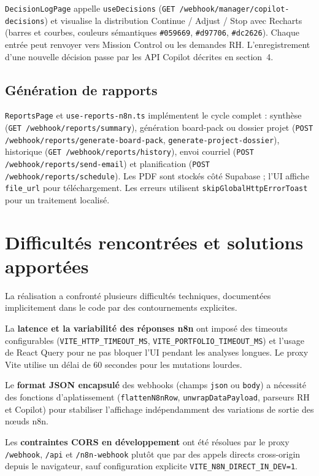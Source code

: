 \texttt{DecisionLogPage} appelle \texttt{useDecisions} (\texttt{GET /webhook/manager/copilot-decisions}) et visualise la distribution Continue / Adjust / Stop avec Recharts (barres et courbes, couleurs sémantiques \texttt{\#059669}, \texttt{\#d97706}, \texttt{\#dc2626}). Chaque entrée peut renvoyer vers Mission Control ou les demandes RH. L'enregistrement d'une nouvelle décision passe par les API Copilot décrites en section~4.

\subsection{Génération de rapports}

\texttt{ReportsPage} et \texttt{use-reports-n8n.ts} implémentent le cycle complet : synthèse (\texttt{GET /webhook/reports/summary}), génération board-pack ou dossier projet (\texttt{POST /webhook/reports/generate-board-pack}, \texttt{generate-project-dossier}), historique (\texttt{GET /webhook/reports/history}), envoi courriel (\texttt{POST /webhook/reports/send-email}) et planification (\texttt{POST /webhook/reports/schedule}). Les PDF sont stockés côté Supabase ; l'UI affiche \texttt{file\_url} pour téléchargement. Les erreurs utilisent \texttt{skipGlobalHttpErrorToast} pour un traitement localisé.

\section{Difficultés rencontrées et solutions apportées}

La réalisation a confronté plusieurs difficultés techniques, documentées implicitement dans le code par des contournements explicites.

La \textbf{latence et la variabilité des réponses n8n} ont imposé des timeouts configurables (\texttt{VITE\_HTTP\_TIMEOUT\_MS}, \texttt{VITE\_PORTFOLIO\_TIMEOUT\_MS}) et l'usage de React Query pour ne pas bloquer l'UI pendant les analyses longues. Le proxy Vite utilise un délai de 60 secondes pour les mutations lourdes.

Le \textbf{format JSON encapsulé} des webhooks (champs \texttt{json} ou \texttt{body}) a nécessité des fonctions d'aplatissement (\texttt{flattenN8nRow}, \texttt{unwrapDataPayload}, parseurs RH et Copilot) pour stabiliser l'affichage indépendamment des variations de sortie des nœuds n8n.

Les \textbf{contraintes CORS en développement} ont été résolues par le proxy \texttt{/webhook}, \texttt{/api} et \texttt{/n8n-webhook} plutôt que par des appels directs cross-origin depuis le navigateur, sauf configuration explicite \texttt{VITE\_N8N\_DIRECT\_IN\_DEV=1}.


